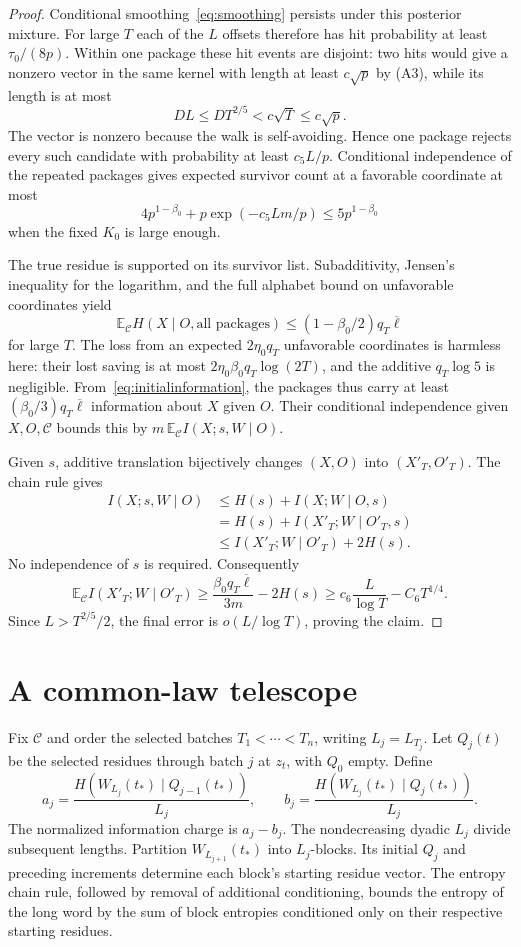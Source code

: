 \documentclass[11pt]{article}
\numberwithin{equation}{section}
\theoremstyle{definition}\newtheorem{definition}[theorem]{Definition}
\theoremstyle{remark}\newtheorem{remark}[theorem]{Remark}
\newcommand{\E}{\mathbb E}\newcommand{\Prob}{\mathbb P}
\newcommand{\Lb}{\overline{\ell}}
\begin{document}
\begin{proof}
Conditional smoothing~\eqref{eq:smoothing} persists under this posterior mixture. For large $T$ each of the $L$ offsets therefore has hit probability at least $\tau_0/(8p)$. Within one package these hit events are disjoint: two hits would give a nonzero vector in the same kernel with length at least $c\sqrt p$ by (A3), while its length is at most
\[
 DL\le DT^{2/5}<c\sqrt T\le c\sqrt p.
\]
The vector is nonzero because the walk is self-avoiding. Hence one package rejects every such candidate with probability at least $c_5L/p$. Conditional independence of the repeated packages gives expected survivor count at a favorable coordinate at most
\[
 4p^{1-\beta_0}+p\exp(-c_5Lm/p)\le5p^{1-\beta_0}
\]
when the fixed $K_0$ is large enough.

The true residue is supported on its survivor list. Subadditivity, Jensen's inequality for the logarithm, and the full alphabet bound on unfavorable coordinates yield
\[
 \E_{\mathcal C}H(X\mid O,\text{all packages})
 \le(1-\beta_0/2)q_T\Lb
\]
for large $T$. The loss from an expected $2\eta_0q_T$ unfavorable coordinates is harmless here: their lost saving is at most $2\eta_0\beta_0q_T\log(2T)$, and the additive $q_T\log5$ is negligible. From~\eqref{eq:initialinformation}, the packages thus carry at least $(\beta_0/3)q_T\Lb$ information about $X$ given $O$. Their conditional independence given $X,O,\mathcal C$ bounds this by
$m\,\E_{\mathcal C}I(X;s,W\mid O)$.

Given $s$, additive translation bijectively changes $(X,O)$ into $(X'_T,O'_T)$. The chain rule gives
\begin{align*}
 I(X;s,W\mid O)
 &\le H(s)+I(X;W\mid O,s)\\
 &=H(s)+I(X'_T;W\mid O'_T,s)\\
 &\le I(X'_T;W\mid O'_T)+2H(s).
\end{align*}
No independence of $s$ is required. Consequently
\[
 \E_{\mathcal C}I(X'_T;W\mid O'_T)
 \ge\frac{\beta_0q_T\Lb}{3m}-2H(s)
 \ge c_6\frac L{\log T}-C_6T^{1/4}.
\]
Since $L>T^{2/5}/2$, the final error is $o(L/\log T)$, proving the claim.
\end{proof}

\section{A common-law telescope}\label{sec:telescope}

Fix $\mathcal C$ and order the selected batches $T_1<\cdots<T_n$, writing $L_j=L_{T_j}$. Let $Q_j(t)$ be the selected residues through batch $j$ at $z_t$, with $Q_0$ empty. Define
\[
 a_j=\frac{H(W_{L_j}(t_*)\mid Q_{j-1}(t_*))}{L_j},
 \qquad
 b_j=\frac{H(W_{L_j}(t_*)\mid Q_j(t_*))}{L_j}.
\]
The normalized information charge is $a_j-b_j$. The nondecreasing dyadic $L_j$ divide subsequent lengths. Partition $W_{L_{j+1}}(t_*)$ into $L_j$-blocks. Its initial $Q_j$ and preceding increments determine each block's starting residue vector. The entropy chain rule, followed by removal of additional conditioning, bounds the entropy of the long word by the sum of block entropies conditioned only on their respective starting residues.
\end{document}
